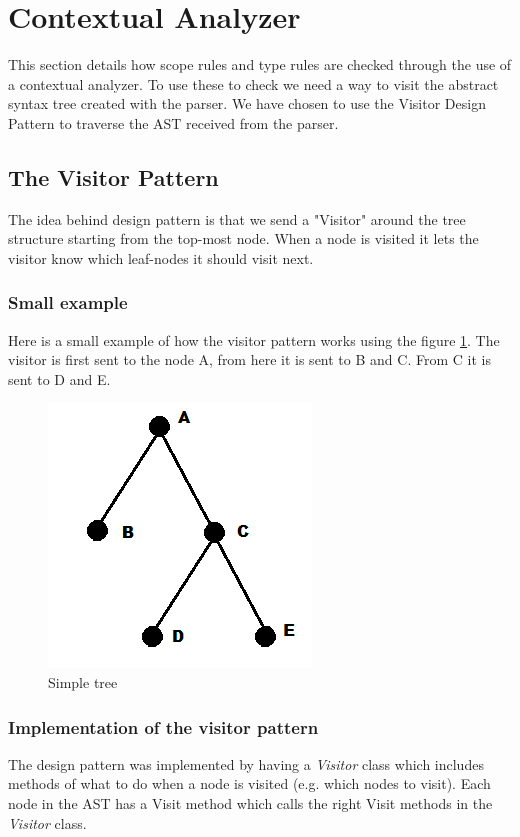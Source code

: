 \section{Contextual Analyzer}
	This section details how scope rules and type rules are checked through the use of a contextual analyzer.
	To use these to check we need a way to visit the abstract syntax tree created with the parser. We have chosen to use 
	the Visitor Design Pattern to traverse the AST received from the parser.
	
	\subsection{The Visitor Pattern}
		The idea behind design pattern is that we send a "Visitor" around the tree structure starting from the top-most node. When a node is 
		visited it lets the visitor know which leaf-nodes it should visit next. \\
		
		\subsubsection*{Small example}
			Here is a small example of how the visitor pattern works using the figure \ref{fig:simpletree}. 
			The visitor is first sent to the node A, from here it is sent to B and C. From C it is sent to D and E.
		
			\begin{figure}
				\centering
				\includegraphics{rapport/6/figures/simpletree}
				\caption{Simple tree} \label{fig:simpletree}
			\end{figure}
			
		\subsubsection{Implementation of the visitor pattern}
			The design pattern was implemented by having a \textit{Visitor} class which includes methods of what to do when a node is visited 
			(e.g. which nodes to visit). Each node in the AST has a Visit method which calls the right Visit methods in the \textit{Visitor} class. \\
	
